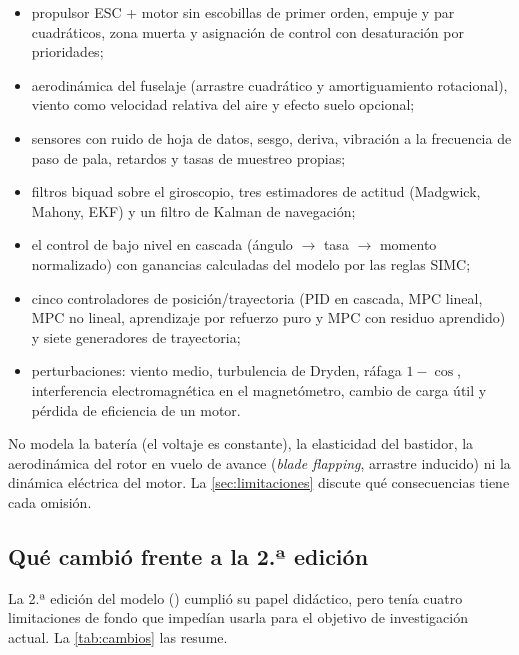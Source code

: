 \begin{itemize}
\item propulsor ESC + motor sin escobillas de primer orden, empuje y par
cuadráticos, zona muerta y asignación de control con desaturación por
prioridades;
\item aerodinámica del fuselaje (arrastre cuadrático y amortiguamiento
rotacional), viento como velocidad relativa del aire y efecto suelo opcional;
\item sensores con ruido de hoja de datos, sesgo, deriva, vibración a la
frecuencia de paso de pala, retardos y tasas de muestreo propias;
\item filtros biquad sobre el giroscopio, tres estimadores de actitud
(Madgwick, Mahony, EKF) y un filtro de Kalman de navegación;
\item el control de bajo nivel en cascada (ángulo $\to$ tasa $\to$ momento
normalizado) con ganancias calculadas del modelo por las reglas SIMC;
\item cinco controladores de posición/trayectoria (PID en cascada, MPC lineal,
MPC no lineal, aprendizaje por refuerzo puro y MPC con residuo aprendido) y
siete generadores de trayectoria;
\item perturbaciones: viento medio, turbulencia de Dryden, ráfaga $1-\cos$,
interferencia electromagnética en el magnetómetro, cambio de carga útil y
pérdida de eficiencia de un motor.
\end{itemize}

No modela la batería (el voltaje es constante), la elasticidad del bastidor,
la aerodinámica del rotor en vuelo de avance (\emph{blade flapping}, arrastre
inducido) ni la dinámica eléctrica del motor. La \cref{sec:limitaciones}
discute qué consecuencias tiene cada omisión.

\subsection{Qué cambió frente a la 2.ª edición}

La 2.ª edición del modelo ()
cumplió su papel didáctico, pero tenía cuatro limitaciones de fondo que
impedían usarla para el objetivo de investigación actual. La
\cref{tab:cambios} las resume.

